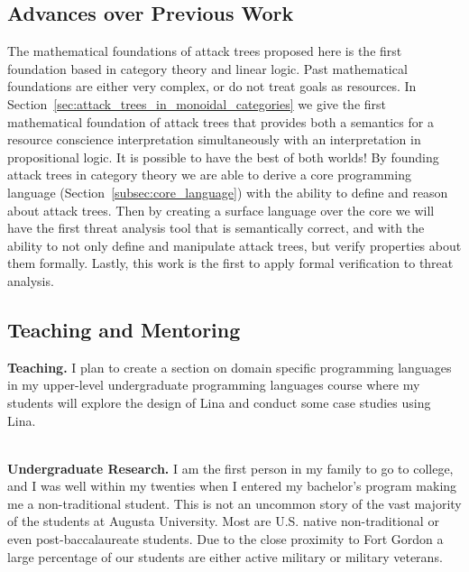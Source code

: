 \begin{full}
\subsection{Advances over Previous Work}
\label{subsec:advances_over_previous_work}
The mathematical foundations of attack trees proposed here is the
first foundation based in category theory and linear logic.  Past
mathematical foundations are either very complex, or do not treat
goals as resources.  In
Section~\ref{sec:attack_trees_in_monoidal_categories} we give the
first mathematical foundation of attack trees that provides both a
semantics for a resource conscience interpretation simultaneously with
an interpretation in propositional logic. It is possible to have the
best of both worlds!  By founding attack trees in category theory we
are able to derive a core programming language
(Section~\ref{subsec:core_language}) with the ability to define and
reason about attack trees.  Then by creating a surface language over
the core we will have the first threat analysis tool that is
semantically correct, and with the ability to not only define and
manipulate attack trees, but verify properties about them formally.
Lastly, this work is the first to apply formal verification to threat
analysis.

\subsection{Teaching and Mentoring}
\label{subsec:teaching_and_mentoring}

\textbf{Teaching.} I plan to create a section on domain specific
programming languages in my upper-level undergraduate programming
languages course where my students will explore the design of Lina and
conduct some case studies using Lina.

\ \\
\noindent
\textbf{Undergraduate Research.}  I am the first person in my family
to go to college, and I was well within my twenties when I entered my
bachelor's program making me a non-traditional student.  This is not
an uncommon story of the vast majority of the students at Augusta
University.  Most are U.S. native non-traditional or even
post-baccalaureate students.  Due to the close proximity to Fort
Gordon a large percentage of our students are either active military
or military veterans.


\end{full}
